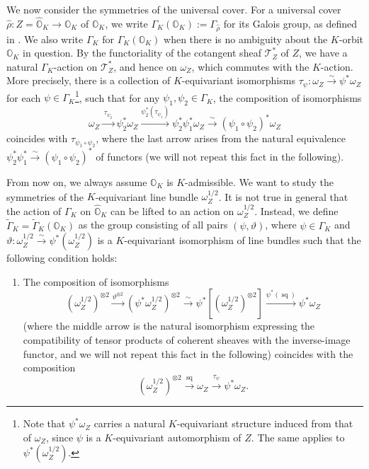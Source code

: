 \documentclass[11pt, a4paper]{amsart}
\newcommand{\orb}{\mathbb{O}}
\newcommand{\orbk}{\orb_{K}}
\newcommand{\horbk}{\widehat{\orb}_{K}}
\newcommand{\tGamma}{\widetilde{\Gamma}}
\DeclareMathOperator{\sq}{sq}
\newcommand{\smallhalf}{{\scriptscriptstyle 1/2}}
\newcommand{\T}{\mathcal{T}}
\theoremstyle{definition}
\numberwithin{equation}{section}
\begin{document}
We now consider the symmetries of the universal cover. 
For a universal cover $\hat{\rho}: Z=\horbk \to \orbk$ of $\orbk$, we write $\Gamma_K(\orbk) := \Gamma_{\hat{\rho}}$ for its Galois group, as defined in . We also write $\Gamma_K$ for $\Gamma_K(\orbk)$ when there is no ambiguity about the $K$-orbit $\orbk$ in question. By the functoriality of the cotangent sheaf $\T^*_Z$ of $Z$, we have a natural $\Gamma_K$-action on $\T^*_Z$, and hence on $\omega_Z$, which commutes with the $K$-action. More precisely, there is a collection of $K$-equivariant isomorphisms $\tau_\psi: \omega_Z \xrightarrow{\sim} \psi^* \omega_Z$ for each $\psi \in \Gamma_K$\footnote{Note that $\psi^*\omega_Z$ carries a natural $K$-equivariant structure induced from that of $\omega_Z$, since $\psi$ is a $K$-equivariant automorphism of $Z$. The same applies to $\psi^*(\omega_Z^{\smallhalf})$.}, such that for any $\psi_1, \psi_2 \in \Gamma_K$, the composition of isomorphisms
\begin{equation} \label{eq:tau_psi}
	\omega_Z \xrightarrow{\,\tau_{\psi_2}\,} \psi_2^* \omega_Z \xrightarrow{\psi_2^*(\tau_{\psi_1})} \psi_2^* \psi_1^* \omega_Z \xrightarrow{\sim} (\psi_1 \circ \psi_2)^* \omega_Z 
\end{equation}
coincides with $\tau_{\psi_1 \circ \psi_2}$, where the last arrow arises from the natural equivalence $\psi_2^* \psi_1^* \xrightarrow{\sim} (\psi_1 \circ \psi_2)^*$ of functors (we will not repeat this fact in the following).

From now on, we always assume $\orbk$ is $K$-admissible. We want to study the symmetries of the $K$-equivariant line bundle $\omega_Z^{\smallhalf}$. It is not true in general that the action of $\Gamma_K$ on $\horbk$ can be lifted to an action on $\omega_Z^{\smallhalf}$. 
Instead, we define $\tGamma_K = \tGamma_K(\orbk)$ as the group consisting of all pairs $(\psi, \vartheta)$, where $\psi \in \Gamma_K$ and $\vartheta: \omega_Z^{\smallhalf} \xrightarrow{\sim} \psi^* (\omega_Z^{\smallhalf})$ is a $K$-equivariant isomorphism of line bundles such that the following condition holds:


\begin{enumerate}[label=($\ast$), ref=($\ast$), itemindent=*, leftmargin=*]
\item \label{cond:tGamma_K} 
The composition of isomorphisms
\[ 
	(\omega_Z^{\smallhalf})^{\otimes 2} \xrightarrow{\vartheta^{\otimes 2}} (\psi^* \omega_Z^{\smallhalf})^{\otimes 2} \xrightarrow{\,\sim\,} \psi^* \left[ (\omega_Z^{\smallhalf})^{\otimes 2} \right] \xrightarrow{\psi^*(\sq)} \psi^* \omega_Z 
\]
(where the middle arrow is the natural isomorphism expressing the compatibility of tensor products of coherent sheaves with the inverse-image functor, and we will not repeat this fact in the following) coincides with the composition
\[ (\omega_Z^{\smallhalf})^{\otimes 2} \xrightarrow{\, \sq \,} \omega_Z \xrightarrow{\,\tau_\psi\,} \psi^* \omega_Z. \]
\end{enumerate}
\end{document}
